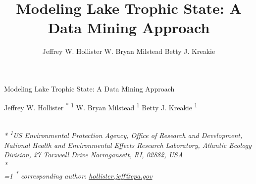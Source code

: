 \documentclass[11pt,]{article}
\title{Modeling Lake Trophic State: A Data Mining Approach}
\author{
Jeffrey W. Hollister
W. Bryan Milstead
Betty J. Kreakie
}
\date{}
\begin{document}
\begin{singlespace}
\begin{center}
\huge Modeling Lake Trophic State: A Data Mining Approach
\end{center}
\begin{center}
\large
Jeffrey W. Hollister \textsuperscript{*} \textsuperscript{1} 
W. Bryan Milstead \textsuperscript{1} 
Betty J. Kreakie \textsuperscript{1} 
\end{center}
\begin{justify}
\footnotesize \emph{ 
\\*
\textsuperscript{1}US Environmental Protection Agency, Office of Research and Development,
National Health and Environmental Effects Research Laboratory, Atlantic
Ecology Division, 27 Tarzwell Drive Narragansett, RI, 02882, USA\\*
}
\setcounter{num}{1}
\\[0.1cm]
\footnotesize \emph{ 
\ifnum\value{num}=1%
\textsuperscript{*} corresponding author:
\fi
\href{mailto:hollister.jeff@epa.gov}{hollister.jeff@epa.gov}
}
\end{justify}
\normalsize

\end{singlespace}
\end{document}
